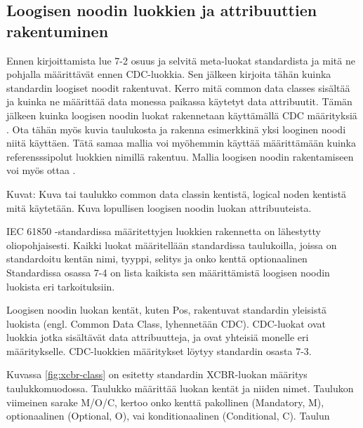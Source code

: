 \subsection{Loogisen noodin luokkien ja attribuuttien rakentuminen}
\begin{it}
	Ennen kirjoittamista lue 7-2 osuus ja selvitä meta-luokat standardista ja mitä ne pohjalla määrittävät ennen CDC-luokkia. Sen jälkeen kirjoita tähän kuinka standardin loogiset noodit rakentuvat. Kerro mitä common data classes sisältää ja kuinka ne määrittää data monessa paikassa käytetyt data attribuutit. Tämän jälkeen kuinka loogisen noodin luokat rakennetaan käyttämällä CDC määrityksiä \cite[s.~26]{IEC61850-1}. Ota tähän myös kuvia taulukosta ja rakenna esimerkkinä yksi looginen noodi niitä käyttäen. Tätä samaa mallia voi myöhemmin käyttää määrittämään kuinka referensssipolut luokkien nimillä rakentuu.
	Mallia loogisen noodin rakentamiseen voi myös ottaa \cite[s.~27]{IEC61850-7-1}.

	Kuvat:
	Kuva tai taulukko common data classin kentistä, logical noden kentistä mitä käytetään.
	Kuva lopullisen loogisen noodin luokan attribuuteista.
\end{it}

IEC 61850 -standardissa määritettyjen luokkien rakennetta on lähestytty oliopohjaisesti. Kaikki luokat määritellään standardissa taulukoilla, joissa on standardoitu kentän nimi, tyyppi, selitys ja onko kenttä optionaalinen Standardissa osassa 7-4 on lista kaikista sen määrittämistä loogisen noodin luokista eri tarkoituksiin. 

Loogisen noodin luokan kentät, kuten Pos, rakentuvat standardin yleisistä luokista (engl. Common Data Class, lyhennetään CDC). CDC-luokat ovat luokkia jotka sisältävät data attribuutteja, ja ovat yhteisiä monelle eri määritykselle. CDC-luokkien määritykset löytyy standardin osasta 7-3.

Kuvassa \ref{fig:xcbr-class} on esitetty standardin XCBR-luokan määritys taulukkomuodossa. Taulukko määrittää luokan kentät ja niiden nimet. Taulukon viimeinen sarake M/O/C, kertoo onko kenttä pakollinen (Mandatory, M), optionaalinen (Optional, O), vai konditionaalinen (Conditional, C). Taulun

